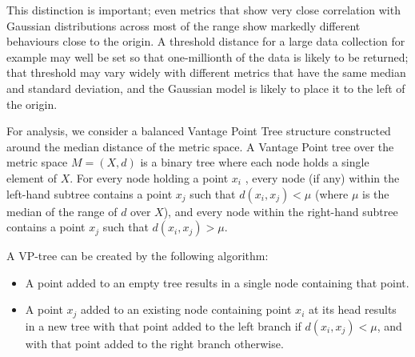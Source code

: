 This distinction is important; even metrics that show very close correlation with Gaussian distributions across most of the range show markedly different behaviours close to the origin. A threshold distance for a large data collection for example may well be set so that one-millionth of the data is likely to be returned; that threshold may vary widely with different metrics that have the same median and standard deviation, and the Gaussian model is likely to place it to the left of the origin.


For analysis, we consider a balanced Vantage Point Tree structure constructed around the median distance of the metric space.
A Vantage Point tree over the metric space $M = (X, d)$ is a binary tree where each node holds a single element of $X$. For every node holding a point $x_i$ , every node (if any) within the left-hand subtree contains a point $x_j$ such that $d(x_i, x_j) < \mu$  (where $\mu$ is the median of the range of $d$ over $X$), and every node within the right-hand subtree contains a point $x_j$ such that $d(x_i , x_j ) > \mu$.

A VP-tree can be created by the following algorithm:
\begin{itemize}
\item A point added to an empty tree results in a single node containing that point.
\item A point $x_j$ added to an existing node containing point $x_i$ at its head results in a new tree with that point added to the left branch if $d(x_i, x_j) < \mu$, and with that point added to the right branch otherwise.
\end{itemize}

